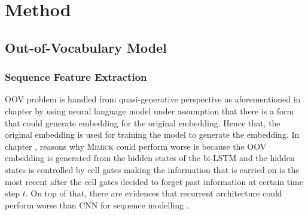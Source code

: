 \chapter{Method}
\label{chap:method}

\section{Out-of-Vocabulary Model}
    \subsection{Sequence Feature Extraction}
        OOV problem is handled from quasi-generative perspective as
        aforementioned in chapter  by using neural
        language model under assumption that there is a form that
        could generate embedding for the original embedding. Hence
        that, the original embedding is used for training the model to
        generate the embedding. In chapter ,
        reasons why \textsc{Mimick} could perform worse is because the
        OOV embedding is generated from the hidden states of the
        bi-LSTM and the hidden states is controlled by cell gates
        making the information that is carried on is the most recent
        after the cell gates decided to forget past information at
        certain time step $t$. On top of that, there are evidences
        that recurrent architecture could perform worse than CNN for
        sequence modelling \citep{empirical2018shaujie}. 
        
